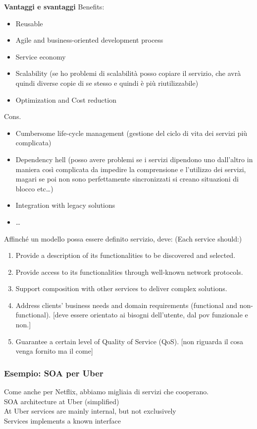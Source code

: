 \textbf{Vantaggi e svantaggi}
Benefits:
\begin{itemize}
    \item Reusable
    \item Agile and business-oriented development process
    \item Service economy
    \item Scalability (se ho problemi di scalabilità posso copiare il servizio, che avrà quindi diverse copie di se stesso e quindi è più riutilizzabile)
    \item Optimization and Cost reduction
\end{itemize}
Cons.
\begin{itemize}
    \item Cumbersome life-cycle management (gestione del ciclo di vita dei servizi più complicata)
    \item Dependency hell (posso avere problemi se i servizi dipendono uno dall'altro in maniera così complicata da impedire la comprensione e l'utilizzo dei servizi, magari se poi non sono perfettamente sincronizzati si creano situazioni di blocco etc\dots)
    \item Integration with legacy solutions
    \item …
\end{itemize}

Affinché un modello possa essere definito servizio, deve: (Each service should:)
\begin{enumerate}
    \item Provide a description of its functionalities to be discovered and selected.
    \item Provide access to its functionalities through well-known network protocols.
    \item Support composition with other services to deliver complex solutions.
    \item Address clients' business needs and domain requirements (functional and non-functional). [deve essere orientato ai bisogni dell'utente, dal pov funzionale e non.]
    \item Guarantee a certain level of Quality of Service (QoS). [non riguarda il cosa venga fornito ma il come]
\end{enumerate}

\subsubsection{Esempio: SOA per Uber}
Come anche per Netflix, abbiamo migliaia di servizi che cooperano.
\\SOA architecture at Uber (simplified)
\\At Uber services are mainly internal, but not exclusively
\\Services implements a known interface

